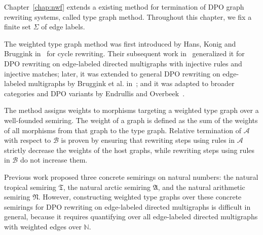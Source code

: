 Chapter~\ref{chap:nwf} extends a existing method for termination of DPO graph rewriting systems, called type graph method. Throughout this chapter, we fix a finite set $\Sigma$ of edge labels.

The weighted type graph method was first introduced by Hans, Konig and Bruggink in~\cite{zantema2014termination} for cycle rewriting. Their subsequent work in~\cite{bruggink2014termination} generalized it for DPO rewriting on edge-labeled directed multigraphs with injective rules and injective matches; later, it was extended to general DPO rewriting on edge-labeled multigraphs by Bruggink et al. in~\cite{bruggink2015proving}; and it was adapted to broader categories and DPO variants by Endrullis and Overbeek~\cite{endrullis2024generalized_icgt}. 

The method assigns weights to morphisms targeting a weighted type graph over a well-founded semiring. The weight of a graph is defined
 as the sum of the weights of all morphisms from that graph to the type graph. Relative termination of $\mathcal{A}$ with respect to $\mathcal{B}$ is proven by ensuring that rewriting steps using rules in \( \mathcal{A} \) strictly decrease the weights of the host graphs, while rewriting steps using rules in \( \mathcal{B} \) do not increase them.
    
   Previous work proposed three concrete semirings on natural numbers: the natural tropical semiring $\mathfrak{T}$, the natural arctic semiring $\mathfrak{A}$, and the natural arithmetic semiring $\mathfrak{N}$.
    However, constructing weighted type graphs over these concrete semirings for DPO rewriting on edge-labeled directed multigraphs is difficult in general, because it requires quantifying over all edge-labeled directed multigraphs with weighted edges over $\mathbb{N}$.


